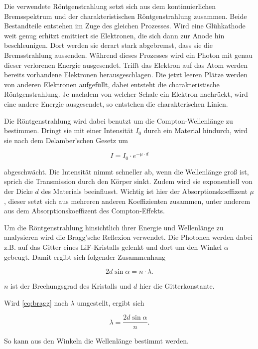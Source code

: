 Die verwendete Röntgenstrahlung setzt sich aus dem kontinuierlichen Bremsspektrum und der charakteristischen Röntgenstrahlung zusammen.
Beide Bestandteile entstehen im Zuge des gleichen Prozesses.
Wird eine Glühkathode weit genug erhitzt emittiert sie Elektronen, die sich dann zur Anode hin beschleunigen.
Dort werden sie derart stark abgebremst, dass sie die Bremsstrahlung aussenden. 
Während dieses Prozesses wird ein Photon mit genau dieser verlorenen Energie ausgesendet.
Trifft das Elektron auf das Atom werden bereits vorhandene Elektronen herausgeschlagen.
Die jetzt leeren Plätze werden von anderen Elektronen aufgefüllt, dabei entsteht die charakteristische Röntgenstrahlung.
Je nachdem von welcher Schale ein Elektron nachrückt, wird eine andere Energie ausgesendet, so entstehen die charakterischen Linien.

Die Röntgenstrahlung wird dabei benutzt um die Compton-Wellenlänge zu bestimmen.
Dringt sie mit einer Intensität $I_0$ durch ein Material hindurch, wird sie nach dem Delamber'schen Gesetz um

\begin{equation}
    I = I_0 \cdot e^{- \mu \cdot d}
    \label{eq:delamber}
\end{equation}

abgeschwächt.
Die Intensität nimmt schneller ab, wenn die Wellenlänge groß ist, sprich die Transmission durch den Körper sinkt.
Zudem wird sie exponentiell von der Dicke $d$ des Materials beeinflusst.
Wichtig ist hier der Absorptionskoeffizent $\mu$, dieser setzt sich aus mehreren anderen Koeffizienten zusammen, unter anderem aus dem Absorptionskoeffizent des Compton-Effekts.

Um die Röntgenstrahlung hinsichtlich ihrer Energie und Wellenlänge zu analysieren wird die Bragg'sche Reflexion verwendet.
Die Photonen werden dabei z.B. auf das Gitter eines LiF-Kristalls gelenkt und dort um den Winkel $\alpha$ gebeugt.
Damit ergibt sich folgender Zusammenhang

\begin{equation}
    2 d \sin{\alpha} = n \cdot \lambda.
    \label{eq:bragg}
\end{equation}

$n$ ist der Brechungsgrad des Kristalls und $d$ hier die Gitterkonstante.

Wird \autoref{eq:bragg} nach $\lambda$ umgestellt, ergibt sich 

\begin{equation}
   \lambda = \frac{2 d \sin{\alpha}}{n}.
   \label{eq:lambda}
\end{equation}

So kann aus den Winkeln die Wellenlänge bestimmt werden.

